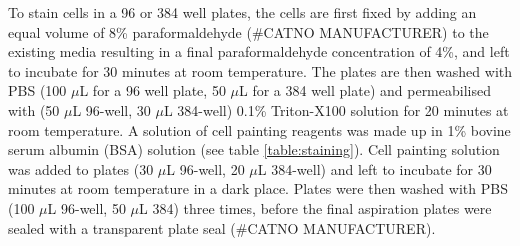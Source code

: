 \documentclass[a4paper,11pt,twoside,openright]{scrbook}
\begin{document}
To stain cells in a 96 or 384 well plates, the cells are first fixed by adding an equal volume of 8\% paraformaldehyde (\#CATNO MANUFACTURER) to the existing media resulting in a final paraformaldehyde concentration of 4\%, and left to incubate for 30 minutes at room temperature.
The plates are then washed with PBS (100 $\mu$L for a 96 well plate, 50 $\mu$L for a 384 well plate) and permeabilised with (50 $\mu$L 96-well, 30 $\mu$L 384-well) 0.1\% Triton-X100 solution for 20 minutes at room temperature.
A solution of cell painting reagents was made up in 1\% bovine serum albumin (BSA) solution (see table \ref{table:staining}).
Cell painting solution was added to plates (30 $\mu$L 96-well, 20 $\mu$L 384-well) and left to incubate for 30 minutes at room temperature in a dark place.
Plates were then washed with PBS (100 $\mu$L 96-well, 50 $\mu$L 384) three times, before the final aspiration plates were sealed with a transparent plate seal (\#CATNO MANUFACTURER).
\end{document}

